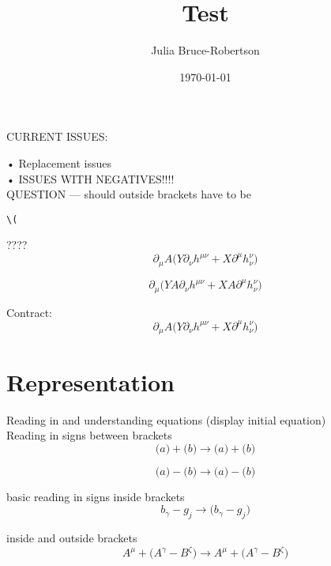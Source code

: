 \documentclass{article}
\title{Test}
\author{Julia Bruce-Robertson}
\date{\today}
\def\){\Big)}
\def\({\Big(}
\begin{document}
\maketitle


CURRENT ISSUES:

•	Replacement issues\\
•	ISSUES WITH NEGATIVES!!!!\\

QUESTION — should outside brackets have to be \begin{verbatim}\(\end{verbatim}????\\

\begin{equation}
\partial_{\mu} A \(Y \partial_{\nu}h^{\mu \nu} + X \partial^{\mu} h^{\nu }_{\nu}\)
\end{equation}

\begin{equation}
\partial_{\mu}\(YA \partial_{\nu}h^{\mu \nu} +XA \partial^{\mu}h_{\nu}^{\nu} \)
\end{equation}


Contract:
\begin{equation}
\partial_{\mu} A \(Y \partial_{\nu}h^{\mu \nu} + X \partial^{\mu} h^{\nu }_{\nu}\)
\end{equation}




\section{Representation}
Reading in and understanding equations (display initial equation)\\


Reading in signs between brackets
\begin{equation}
\(a\) + \(b\) 
\rightarrow
\(a \)+\(b \)
\end{equation}

\begin{equation}
\(a \)-\(b \) 
\rightarrow 
\(a \)-\(b \)
\end{equation}

basic reading in signs inside brackets
\begin{equation}
b_{\gamma} - g_{j} 
\rightarrow 
\( b_{\gamma} - g_{j} \)
\end{equation}

inside and outside brackets
\begin{equation}
A^{\mu} + \(A^{\gamma} - B^{\zeta}\) 
\rightarrow
A^{\mu} +\( A^{\gamma} - B^{\zeta} \)
\end{equation}
\end{document}
